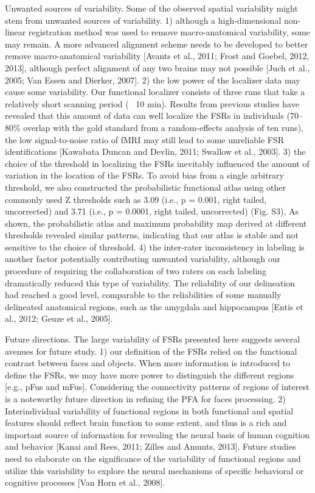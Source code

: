 Unwanted sources of variability.
%
Some of the observed spatial variability might stem from unwanted sources of
variability.
%
1) although a high-dimensional non-linear registration method was used to remove
macro-anatomical variability, some may remain.
%
A more advanced alignment scheme needs to be developed to better remove
macro-anatomical variability [Avants et al., 2011; Frost and Goebel, 2012,
2013], although perfect alignment of any two brains may not possible [Juch et
al., 2005; Van Essen and Dierker, 2007].
%
2) the low power of the localizer data may cause some variability.
%
Our functional localizer consists of three runs that take a relatively short
scanning period (~ 10 min).
%
Results from previous studies have revealed that this amount of data can well
localize the FSRs in individuals (70–80\% overlap with the gold standard from a
random-effects analysis of ten runs), the low signal-to-noise ratio of fMRI may
still lead to some unreliable FSR identifications [Kawabata Duncan and Devlin,
2011; Swallow et al., 2003].
%
3) the choice of the threshold in localizing the FSRs inevitably influenced the
amount of variation in the location of the FSRs.
%
To avoid bias from a single arbitrary threshold, we also constructed the
probabilistic functional atlas using other commonly used Z thresholds such as
3.09 (i.e., p = 0.001, right tailed, uncorrected) and 3.71 (i.e., p = 0.0001,
right tailed, uncorrected) (Fig. S3),
%
As shown, the probabilistic atlas and maximum probability map derived at
different thresholds revealed similar patterns, indicating that our atlas is
stable and not sensitive to the choice of threshold.
%
4) the inter-rater inconsistency in labeling is another factor potentially
contributing unwanted variability, although our procedure of requiring the
collaboration of two raters on each labeling dramatically reduced this type of
variability.
%
The reliability of our delineation had reached a good level, comparable to the
reliabilities of some manually delineated anatomical regions, such as the
amygdala and hippocampus [Entis et al., 2012; Geuze et al., 2005].

Future directions.
%
The large variability of FSRs presented here suggests several avenues for future
study.
%
1) our definition of the FSRs relied on the functional contrast between faces
and objects.
%
When more information is introduced to define the FSRs, we may have more power
to distinguish the different regions [e.g., pFus and mFus].
%
Considering the connectivity patterns of regions of interest is a noteworthy
future direction in refining the PFA for faces processing.
%
2) Interindividual variability of functional regions in both functional and
spatial features should reflect brain function to some extent, and thus is a
rich and important source of information for revealing the neural basis of human
cognition and behavior [Kanai and Rees, 2011; Zilles and Amunts, 2013].
%
Future studies need to elaborate on the significance of the variability of
functional regions and utilize this variability to explore the neural mechanisms
of specific behavioral or cognitive processes [Van Horn et al., 2008].


